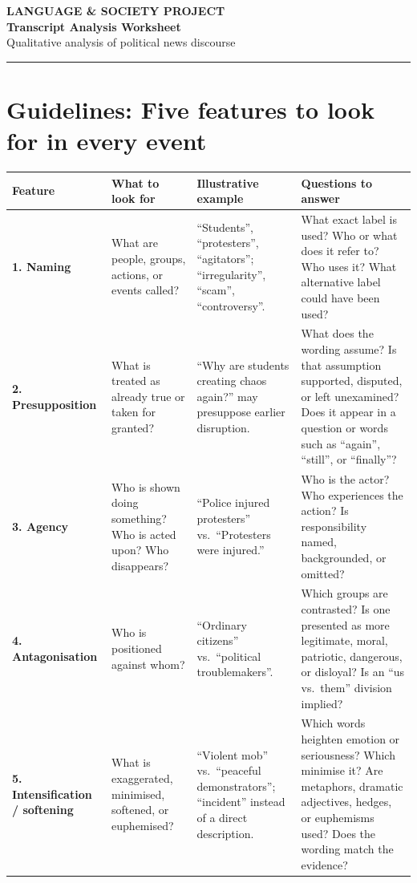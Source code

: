 \documentclass[10pt,a4paper]{article}
\begin{document}
\begin{center}
{\large\textbf{LANGUAGE \& SOCIETY PROJECT}}\\[4pt]
{\LARGE\textbf{Transcript Analysis Worksheet}}\\[4pt]
{\normalsize Qualitative analysis of political news discourse}
\end{center}
\vspace{2pt}
\noindent\rule{\textwidth}{0.4pt}

\section*{Guidelines: Five features to look for in every event}

\begin{center}
\small
\begin{tabular}{@{}>{\raggedright\arraybackslash}p{} >{\raggedright\arraybackslash}p{} >{\raggedright\arraybackslash}p{} >{\raggedright\arraybackslash}p{}@{}}
\toprule
\textbf{Feature} & \textbf{What to look for} & \textbf{Illustrative example} & \textbf{Questions to answer} \\
\midrule
\textbf{1. Naming} & What are people, groups, actions, or events called? & ``Students'', ``protesters'', ``agitators''; ``irregularity'', ``scam'', ``controversy''. & What exact label is used? Who or what does it refer to? Who uses it? What alternative label could have been used? \\[6pt]
\textbf{2. Presupposition} & What is treated as already true or taken for granted? & ``Why are students creating chaos again?'' may presuppose earlier disruption. & What does the wording assume? Is that assumption supported, disputed, or left unexamined? Does it appear in a question or words such as ``again'', ``still'', or ``finally''? \\[6pt]
\textbf{3. Agency} & Who is shown doing something? Who is acted upon? Who disappears? & ``Police injured protesters'' vs.\ ``Protesters were injured.'' & Who is the actor? Who experiences the action? Is responsibility named, backgrounded, or omitted? \\[6pt]
\textbf{4. Antagonisation} & Who is positioned against whom? & ``Ordinary citizens'' vs.\ ``political troublemakers''. & Which groups are contrasted? Is one presented as more legitimate, moral, patriotic, dangerous, or disloyal? Is an ``us vs.\ them'' division implied? \\[6pt]
\textbf{5. Intensification / softening} & What is exaggerated, minimised, softened, or euphemised? & ``Violent mob'' vs.\ ``peaceful demonstrators''; ``incident'' instead of a direct description. & Which words heighten emotion or seriousness? Which minimise it? Are metaphors, dramatic adjectives, hedges, or euphemisms used? Does the wording match the evidence? \\
\bottomrule
\end{tabular}
\end{center}
\end{document}
